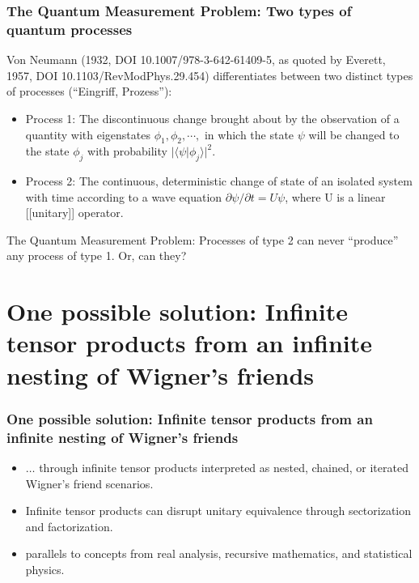 \documentclass[amsmath,table,sans,amsfonts,hyperref={colorlinks,citecolor=blue,linkcolor=blue,urlcolor=purple}]{beamer}
\begin{document}
\begin{frame}%
 \frametitle{The Quantum Measurement Problem: Two types of quantum processes}

Von Neumann (1932, DOI 10.1007/978-3-642-61409-5, as quoted by Everett, 1957, DOI 10.1103/RevModPhys.29.454)
differentiates between two distinct types of processes (``Eingriff, Prozess''):


\begin{itemize}

\pause
\item   \color{magenta}
Process 1: The discontinuous change brought about
by the observation of a quantity with eigenstates
$\phi_1, \phi_2, \cdots ,$
in which the state $\psi$ will be changed to
the state $\phi_j$ with probability $\vert \langle \psi \vert \phi_j \rangle \vert^2$.

\pause
\item  \color{magenta}
Process 2: The continuous, deterministic change of
state of an isolated system with time according to
a wave equation $\partial \psi / \partial t= U \psi$, where U is a linear [[unitary]]
operator.

\end{itemize}


\pause
\color{blue}
The Quantum Measurement Problem:
Processes of type 2 can never ``produce'' any process of type 1. Or, can they?

\end{frame}


\section{One possible solution: Infinite tensor products from an infinite nesting of Wigner's friends}

\begin{frame}%
 \frametitle{One possible solution: Infinite tensor products from an infinite nesting of Wigner's friends}

{\Large
\begin{itemize}

\pause
\item  \color{magenta}
$\ldots$ through infinite tensor products interpreted as nested, chained, or iterated Wigner's friend scenarios.

\pause
\item  \color{magenta}
Infinite tensor products can disrupt unitary equivalence through sectorization and factorization.

\pause
\item  \color{magenta}
parallels to concepts from real analysis, recursive mathematics, and statistical physics.

\end{itemize}
}

\end{frame}
\end{document}
